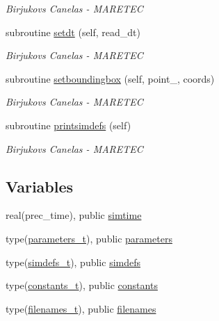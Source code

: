 \begin{DoxyCompactItemize}
\begin{DoxyCompactList}\small\item\em Birjukovs Canelas -\/ M\+A\+R\+E\+T\+EC \end{DoxyCompactList}\item 
subroutine \hyperlink{namespacesimulation__globals_a3ef0462db5a60ac79304cabd2fdd914d}{setdt} (self, read\+\_\+dt)
\begin{DoxyCompactList}\small\item\em Birjukovs Canelas -\/ M\+A\+R\+E\+T\+EC \end{DoxyCompactList}\item 
subroutine \hyperlink{namespacesimulation__globals_a1fc4653684d73efecdbd140b6cafe541}{setboundingbox} (self, point\+\_\+, coords)
\begin{DoxyCompactList}\small\item\em Birjukovs Canelas -\/ M\+A\+R\+E\+T\+EC \end{DoxyCompactList}\item 
subroutine \hyperlink{namespacesimulation__globals_ad90d6959da1d43e2cd1febff82187ed5}{printsimdefs} (self)
\begin{DoxyCompactList}\small\item\em Birjukovs Canelas -\/ M\+A\+R\+E\+T\+EC \end{DoxyCompactList}\end{DoxyCompactItemize}
\subsection*{Variables}
\begin{DoxyCompactItemize}
\item 
real(prec\+\_\+time), public \hyperlink{namespacesimulation__globals_a10daac198c63b06f99ec0c01b614a352}{simtime}
\item 
type(\hyperlink{structsimulation__globals_1_1parameters__t}{parameters\+\_\+t}), public \hyperlink{namespacesimulation__globals_ac23e87cbb2256792d683ab1bf5dc5e21}{parameters}
\item 
type(\hyperlink{structsimulation__globals_1_1simdefs__t}{simdefs\+\_\+t}), public \hyperlink{namespacesimulation__globals_ae851f977b442737307cd4bb76f2f68be}{simdefs}
\item 
type(\hyperlink{structsimulation__globals_1_1constants__t}{constants\+\_\+t}), public \hyperlink{namespacesimulation__globals_aa3e1a54abbb08d2c09978a3509ec4303}{constants}
\item 
type(\hyperlink{structsimulation__globals_1_1filenames__t}{filenames\+\_\+t}), public \hyperlink{namespacesimulation__globals_ada5ae97821ffcb77674c3470431101e3}{filenames}
\end{DoxyCompactItemize}


